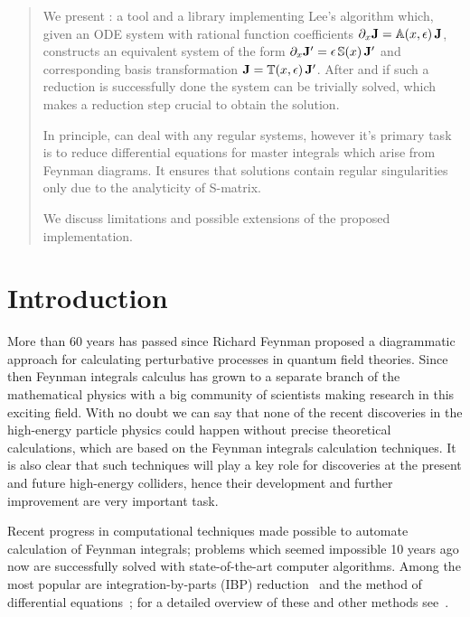 \documentclass[12pt,a4paper]{article}
\begin{document}
\maketitle
\thispagestyle{empty}

\begin{abstract}
We present \fuchsia: a tool and a library implementing Lee's algorithm \cite{Lee15} which, given an ODE system with rational function coefficients $\partial_x \mathbf{J} = \mathbb{A}(x,\epsilon)\,\mathbf{J}$, constructs an equivalent system of the form $\partial_x \mathbf{J}' = \epsilon\,\mathbb{S}(x)\,\mathbf{J}'$ and corresponding basis transformation $\mathbf{J} = \mathbb{T}(x,\epsilon)\,\mathbf{J}'$.
After and if such a reduction is successfully done the system can be trivially solved, which makes a reduction step crucial to obtain the solution.

In principle, \fuchsia can deal with any regular systems, however it's primary task is to reduce differential equations for master integrals which arise from Feynman diagrams.
It ensures that solutions contain regular singularities only due to the analyticity of S-matrix.

We discuss limitations and possible extensions of the proposed implementation.
\end{abstract}
\newpage


\newpage

\tableofcontents

\section{Introduction}

More than 60 years has passed since Richard Feynman proposed a diagrammatic approach for calculating perturbative processes in quantum field theories.
Since then Feynman integrals calculus has grown to a separate branch of the mathematical physics with a big community of scientists making research in this exciting field.
With no doubt we can say that none of the recent discoveries in the high-energy particle physics could happen without precise theoretical calculations, which are based on the Feynman integrals calculation techniques. 
It is also clear that such techniques will play a key role for discoveries at the present and future high-energy colliders, hence their development and further improvement are very important task.

Recent progress in computational techniques made possible to automate calculation of Feynman integrals; problems which seemed impossible 10 years ago now are successfully solved with state-of-the-art computer algorithms.
Among the most popular are integration-by-parts (IBP) reduction~\cite{CT81} and the method of differential equations~\cite{Kot91a,Kot91b,Kot91c}; for a detailed overview of these and other methods see~\cite{Smi06}.
\end{document}
